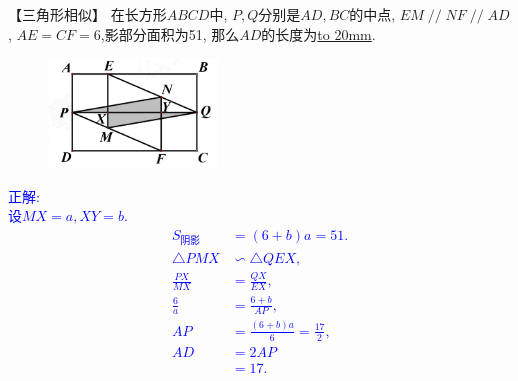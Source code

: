 \item {
    【三角形相似】
    在长方形$ABCD$中, $P,Q$分别是$AD,BC$的中点, $EM\mathop{//}NF\mathop{//}AD$, $AE=CF=6$,影部分面积为51, 那么$AD$的长度为\underline{\hbox to 20mm{}}.
    \begin{figure}[H] 
        \centering
        \includegraphics[width=0.4\textwidth]{./pics/Chapter_2/1.png}
    \end{figure}
    \ifshowSolution 
        \fangsong{}\textcolor{blue}{
            正解: \\
            设$MX=a, XY =b$.\\
            \begin{align*}
                S_{阴影} &= (6+b)a = 51. \\
                \triangle PMX &\backsim \triangle QEX,\\
                \frac{PX}{MX} &= \frac{QX}{EX}, \\
                \frac{6}{a} &= \frac{6+b}{AP}, \\
                AP &= \frac{(6+b)a}{6} = \frac{17}{2}, \\
                AD &= 2AP \\
                &= 17. \\
            \end{align*}
        }
    \else
        \vspace{1cm}
    \fi
}

